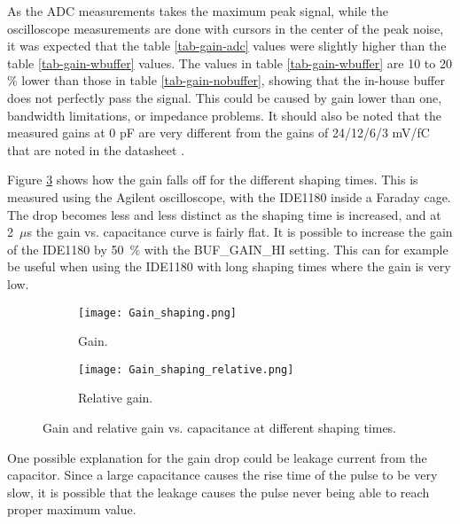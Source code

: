 \documentclass[../main/thesis.tex]{subfiles}
\begin{document}
\newpage
As the ADC measurements takes the maximum peak signal, while the oscilloscope measurements are done with cursors in the center of the peak noise, it was expected that the table \ref{tab-gain-adc} values were slightly higher than the table \ref{tab-gain-wbuffer} values. The values in table \ref{tab-gain-wbuffer} are 10 to 20 \% lower than those in table \ref{tab-gain-nobuffer}, showing that the in-house buffer does not perfectly pass the signal. This could be caused by gain lower than one, bandwidth limitations, or impedance problems. It should also be noted that the measured gains at 0 pF are very different from the gains of 24/12/6/3 mV/fC that are noted in the datasheet \citep{IDE1180}. 



Figure \ref{fig-IDE1180-gain} shows how the gain falls off for the different shaping times. This is measured using the Agilent oscilloscope, with the IDE1180 inside a Faraday cage. The drop becomes less and less distinct as the shaping time is increased, and at 2~$\mu$s the gain vs. capacitance curve is fairly flat. It is possible to increase the gain of the IDE1180 by 50~\% with the BUF\_GAIN\_HI setting. This can for example be useful when using the IDE1180 with long shaping times where the gain is very low.


\begin{figure}[h]%
	\centering
	\begin{subfigure}{.5\textwidth}
		\centering
		\texttt{[image: Gain\_shaping.png]}
		\caption{Gain.}
		\label{fig-IDE1180-gain-}
	\end{subfigure}%
	\begin{subfigure}{.5\textwidth}
		\centering
		\texttt{[image: Gain\_shaping\_relative.png]}
		\caption{Relative gain.}
		\label{fig-IDE1180-gain-rel} %
	\end{subfigure}
	\caption{Gain and relative gain vs. capacitance at different shaping times.}
	\label{fig-IDE1180-gain}
\end{figure}

One possible explanation for the gain drop could be leakage current from the capacitor. Since a large capacitance causes the rise time of the pulse to be very slow, it is possible that the leakage causes the pulse never being able to reach proper maximum value. 
\end{document}
